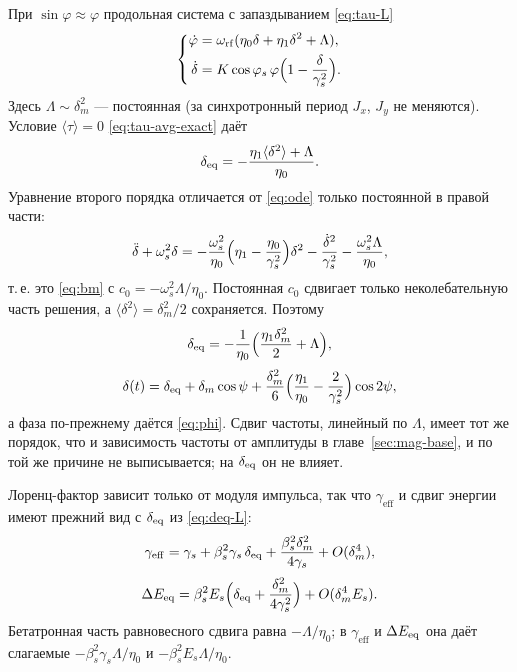 При $\sin\varphi\approx\varphi$ продольная система с запаздыванием \eqref{eq:tau-L}
\begin{equation}
\label{eq:system-L}
\left\{
\begin{aligned}
\dot\varphi
&=\omega_{\mathrm{rf}}(\eta_0\delta+\eta_1\delta^2+\Lambda),\\
\dot\delta
&=K\cos\varphi_s\,\varphi\Bigl(1-\frac{\delta}{\gamma_s^2}\Bigr).
\end{aligned}
\right.
\end{equation}
Здесь $\Lambda\sim\delta_m^2$ --- постоянная (за синхротронный период $J_x$, $J_y$ не меняются). Условие $\langle\tau\rangle=0$ \eqref{eq:tau-avg-exact} даёт
\begin{equation}
\label{eq:deq-raw-L}
\delta_{\mathrm{eq}}
=-\frac{\eta_1\langle\delta^2\rangle+\Lambda}{\eta_0}.
\end{equation}
Уравнение второго порядка отличается от \eqref{eq:ode} только постоянной в правой части:
\begin{equation}
\label{eq:ode-L}
\ddot\delta+\omega_s^2\delta
=-\frac{\omega_s^2}{\eta_0}\Bigl(\eta_1-\frac{\eta_0}{\gamma_s^2}\Bigr)\delta^2
-\frac{\dot\delta^2}{\gamma_s^2}
-\frac{\omega_s^2\Lambda}{\eta_0},
\end{equation}
т.\,е. это \eqref{eq:bm} с $c_0=-\omega_s^2\Lambda/\eta_0$. Постоянная $c_0$ сдвигает только неколебательную часть решения, а $\langle\delta^2\rangle=\delta_m^2/2$ сохраняется. Поэтому
\begin{equation}
\label{eq:deq-L}
\delta_{\mathrm{eq}}
=-\frac{1}{\eta_0}\Bigl(\frac{\eta_1\delta_m^2}{2}+\Lambda\Bigr),
\end{equation}
\begin{equation}
\label{eq:delta-L}
\delta(t)
=\delta_{\mathrm{eq}}
+\delta_m\cos\psi
+\frac{\delta_m^2}{6}\Bigl(\frac{\eta_1}{\eta_0}-\frac{2}{\gamma_s^2}\Bigr)\cos 2\psi,
\end{equation}
а фаза по-прежнему даётся \eqref{eq:phi}. Сдвиг частоты, линейный по $\Lambda$, имеет тот же порядок, что и зависимость частоты от амплитуды в главе~\ref{sec:mag-base}, и по той же причине не выписывается; на $\delta_{\mathrm{eq}}$ он не влияет.

Лоренц-фактор зависит только от модуля импульса, так что $\gamma_{\mathrm{eff}}$ и сдвиг энергии имеют прежний вид с $\delta_{\mathrm{eq}}$ из \eqref{eq:deq-L}:
\begin{equation}
\label{eq:gamma-L}
\gamma_{\mathrm{eff}}
=\gamma_s+\beta_s^2\gamma_s\,\delta_{\mathrm{eq}}
+\frac{\beta_s^2\delta_m^2}{4\gamma_s}
+O(\delta_m^4),
\end{equation}
\begin{equation}
\label{eq:dE-L}
\Delta E_{\mathrm{eq}}
=\beta_s^2E_s\Bigl(\delta_{\mathrm{eq}}+\frac{\delta_m^2}{4\gamma_s^2}\Bigr)
+O(\delta_m^4 E_s).
\end{equation}
Бетатронная часть равновесного сдвига равна $-\Lambda/\eta_0$; в $\gamma_{\mathrm{eff}}$ и $\Delta E_{\mathrm{eq}}$ она даёт слагаемые $-\beta_s^2\gamma_s\Lambda/\eta_0$ и $-\beta_s^2E_s\Lambda/\eta_0$.

